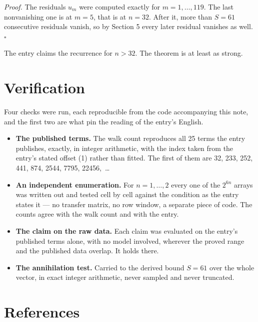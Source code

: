 \documentclass[11pt]{article}
\theoremstyle{definition}
\begin{document}
{\itshape Proof.} The residuals $u_m$ were computed exactly for $m = 1,\dots,119$. The last nonvanishing one is at $m = 5$, that is at $n = 32$. After it, more than $S = 61$ consecutive residuals vanish, so by Section 5 every later residual vanishes as well. $\square$

The entry claims the recurrence for $n > 32$. The theorem is at least as strong.

\section{Verification}

Four checks were run, each reproducible from the code accompanying this note, and the first two are what pin the reading of the entry's English.

\begin{itemize}

\item {\bfseries The published terms.} The walk count reproduces all 25 terms the entry publishes, exactly, in integer arithmetic, with the index taken from the entry's stated offset (1) rather than fitted. The first of them are 32, 233, 252, 441, 874, 2544, 7795, 22456,~\dots

\item {\bfseries An independent enumeration.} For $n = 1,\dots,2$ every one of the $2^{6n}$ arrays was written out and tested cell by cell against the condition as the entry states it --- no transfer matrix, no row window, a separate piece of code. The counts agree with the walk count and with the entry.

\item {\bfseries The claim on the raw data.} Each claim was evaluated on the entry's published terms alone, with no model involved, wherever the proved range and the published data overlap. It holds there.

\item {\bfseries The annihilation test.} Carried to the derived bound $S = 61$ over the whole vector, in exact integer arithmetic, never sampled and never truncated.

\end{itemize}

\section{References}
\end{document}
